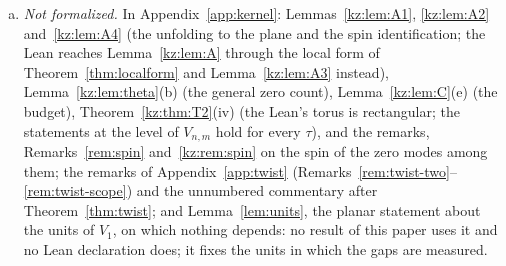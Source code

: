 \begin{enumerate}[(a)]
reviewed, as implications from the named hypotheses \texttt{HasTenZeroModes} and \texttt{HasTwoZeroModes} --- exactly ten zero
modes in the sector $(N/2,N/2)$ at every even $N$ (for Corollary~\ref{cor:uniform}, on every torus of the family), respectively
exactly two in each of the sectors $((N\pm1)/2,(N\mp1)/2)$ at every odd $N\ge3$, the content of Theorem~\ref{thm:kernel}
together with $H_N\ge0$ (\texttt{hollow\_core\_index}, \texttt{hollow\_core\_E11\_tendsto}, \texttt{odd\_E3\_tendsto},
\texttt{odd\_many\_small}, \texttt{uniform\_E11\_tendsto}, \texttt{uniform\_E11\_eventually}). The unconditional forms are
derived from the same statements under the weaker hypotheses \texttt{HasAtLeastTenZeroModes} and
\texttt{HasAtLeastTwoZeroModes} (at least ten, at least two), which the lower bound discharges. The named hypotheses
themselves are theorems (\texttt{hasTenZeroModes}, \texttt{hasTwoZeroModes}, from the exact counts), so the reviewed statements,
too, hold for the rectangular tori with no hypothesis on the zero modes.
\item \emph{Not formalized.} In Appendix~\ref{app:kernel}: Lemmas~\ref{kz:lem:A1}, \ref{kz:lem:A2} and~\ref{kz:lem:A4} (the
unfolding to the plane and the spin identification; the Lean reaches Lemma~\ref{kz:lem:A} through the local form of
Theorem~\ref{thm:localform} and Lemma~\ref{kz:lem:A3} instead), Lemma~\ref{kz:lem:theta}(b) (the general zero count),
Lemma~\ref{kz:lem:C}(e) (the budget), Theorem~\ref{kz:thm:T2}(iv) (the Lean's torus is rectangular; the statements at the level
of $V_{n,m}$ hold for every $\tau$), and the remarks, Remarks~\ref{rem:spin} and~\ref{kz:rem:spin} on the spin of the zero
modes among them; the remarks of Appendix~\ref{app:twist} (Remarks~\ref{rem:twist-two}--\ref{rem:twist-scope}) and the
unnumbered commentary after Theorem~\ref{thm:twist}; and Lemma~\ref{lem:units}, the planar statement about the units of $V_1$, on which nothing depends: no result of
this paper uses it and no Lean declaration does; it fixes the units in which the gaps are measured.
\end{enumerate}


